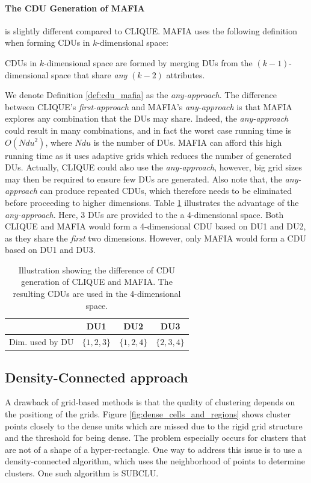\paragraph{The CDU Generation of MAFIA}
is slightly different compared to CLIQUE. MAFIA uses the following definition when forming CDUs in $k$-dimensional space:
\begin{definition}\label{def:cdu_mafia}
    CDUs in $k$-dimensional space are formed by merging DUs from the $(k-1)$-dimensional space that share \textit{any} $(k-2)$ attributes.
\end{definition}
We denote Definition \ref{def:cdu_mafia} as the \textit{any-approach}. The difference between CLIQUE's \textit{first-approach} and MAFIA's \textit{any-approach} is that MAFIA explores any combination that the DUs may share. Indeed, the \textit{any-approach} could result in many combinations, and in fact the worst case running time is $O(Ndu^2)$, where $Ndu$ is the number of DUs. MAFIA can afford this high running time as it uses adaptive grids which reduces the number of generated DUs. Actually, CLIQUE could also use the \textit{any-approach}, however, big grid sizes may then be required to ensure few DUs are generated. Also note that, the \textit{any-approach} can produce repeated CDUs, which therefore needs to be eliminated before proceeding to higher dimensions. Table \ref{tab:cdu} illustrates the advantage of the \textit{any-approach}. Here, 3 DUs are provided to the a 4-dimensional space. Both CLIQUE and MAFIA would form a 4-dimensional CDU based on DU1 and DU2, as they share the \textit{first} two dimensions. However, only MAFIA would form a CDU based on DU1 and DU3.
\begin{table}[H]
    \vspace*{-0.5cm}
    \centering
    \begin{tabular}{l|c|c|c|}
                        & DU1           & DU2           & DU3           \\ \hline
        Dim. used by DU & $\{1, 2, 3\}$ & $\{1, 2, 4\}$ & $\{2, 3, 4\}$ \\
    \end{tabular}
    \vspace*{0.2cm}
    \caption{Illustration showing the difference of CDU generation of CLIQUE and MAFIA. The resulting CDUs are used in the 4-dimensional space.}
    \label{tab:cdu}
    \vspace*{-0.5cm}
\end{table}

\subsection{Density-Connected approach}
A drawback of grid-based methods is that the quality of clustering depends on the positiong of the grids. Figure \ref{fig:dense_cells_and_regions} shows cluster points closely to the dense units which are missed due to the rigid grid structure and the threshold for being dense. The problem especially occurs for clusters that are not of a shape of a hyper-rectangle. One way to address this issue is to use a density-connected algorithm, which uses the neighborhood of points to determine clusters. One such algorithm is SUBCLU.

